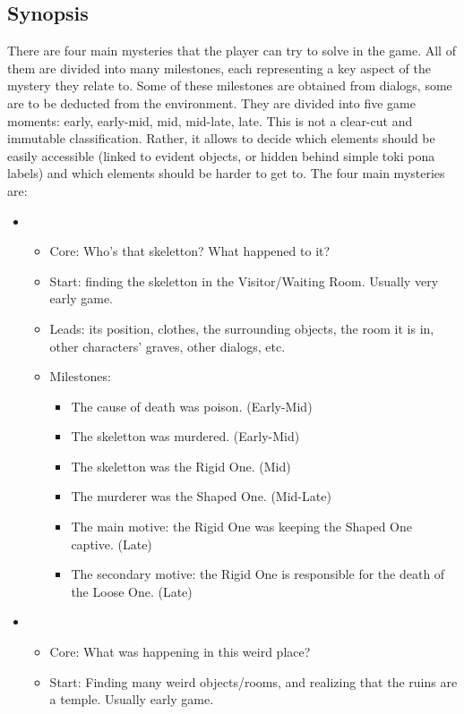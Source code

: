\documentclass{scrartcl}
\let\emph\relax %
\begin{document}
		\subsection{Synopsis}
		There are four main mysteries that the player can try to solve in the game. All of them are divided into many milestones, each representing a key aspect of the mystery they relate to. Some of these milestones are obtained from dialogs, some are to be deducted from the environment. They are divided into five game moments: early, early-mid, mid, mid-late, late. This is not a clear-cut and immutable classification. Rather, it allows to decide which elements should be easily accessible (linked to evident objects, or hidden behind simple toki pona labels) and which elements should be harder to get to. The four main mysteries are:
		\begin{itemize}
			\item \emph{The Skeleton}
			\begin{itemize}
				\item Core: Who's that skeletton? What happened to it?
				\item Start: finding the skeletton in the Visitor/Waiting Room. Usually very early game.
				\item Leads: its position, clothes, the surrounding objects, the room it is in, other characters' graves, other dialogs, etc.
				\item Milestones:
					\begin{itemize}
						\item The cause of death was poison. (Early-Mid)
						\item The skeletton was murdered. (Early-Mid)
						\item The skeletton was the Rigid One. (Mid)
						\item The murderer was the Shaped One. (Mid-Late)
						\item The main motive: the Rigid One was keeping the Shaped One captive. (Late)
						\item The secondary motive: the Rigid One is responsible for the death of the Loose One. (Late)
					\end{itemize}
			\end{itemize}
			\item \emph{The Cult's Rituals}
			\begin{itemize}
				\item Core: What was happening in this weird place?
				\item Start: Finding many weird objects/rooms, and realizing that the ruins are a temple. Usually early game.

\end{itemize}
\end{itemize}
\end{document}
